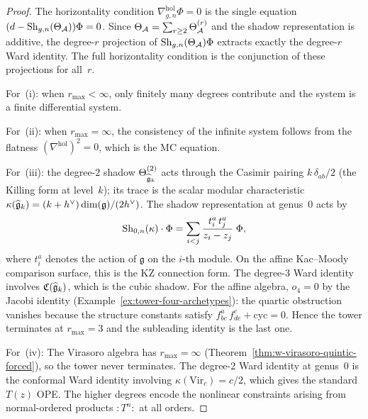 \begin{proof}
The horizontality condition $\nabla^{\mathrm{hol}}_{g,n}\Phi = 0$
is the single equation $(d - \operatorname{Sh}_{g,n}(\Theta_{\mathcal{A}}))\Phi = 0$.
Since $\Theta_{\mathcal{A}} = \sum_{r \geq 2} \Theta_{\mathcal{A}}^{(r)}$ and the
shadow representation is additive, the degree-$r$ projection of
$\operatorname{Sh}_{g,n}(\Theta_{\mathcal{A}})\Phi$ extracts exactly the degree-$r$ Ward
identity. The full horizontality condition is the conjunction of
these projections for all~$r$.

For~(i): when $r_{\max} < \infty$, only finitely many degrees
contribute and the system is a finite differential system.

For~(ii): when $r_{\max} = \infty$, the consistency of the
infinite system follows from the flatness
$(\nabla^{\mathrm{hol}})^2 = 0$, which is the MC equation.

For~(iii): the degree-$2$ shadow $\Theta^{(2)}_{\widehat{\mathfrak{g}}_k}$
acts through the Casimir pairing $k\,\delta_{ab}/2$ (the Killing form
at level~$k$); its trace is the scalar modular characteristic
$\kappa(\widehat{\mathfrak{g}}_k) = (k+h^\vee)\dim(\mathfrak{g})/(2h^\vee)$.
The shadow representation at genus~$0$ acts by
\begin{equation}\label{eq:thqg-VI-kz-recovery}
\operatorname{Sh}_{0,n}(\kappa) \cdot \Phi
= \sum_{i < j} \frac{t^a_i\,t^a_j}{z_i - z_j}\;\Phi,
\end{equation}
where $t^a_i$ denotes the action of $\mathfrak{g}$ on the
$i$-th module. On the affine Kac--Moody comparison surface, this
is the KZ connection form. The degree-$3$
Ward identity involves $\mathfrak{C}(\widehat{\mathfrak{g}}_k)$, which
is the cubic shadow. For the affine algebra, $o_4 = 0$ by the
Jacobi identity
(Example~\ref{ex:tower-four-archetypes}): the quartic obstruction
vanishes because the structure constants satisfy
$f^a_{bc}\,f^c_{de} + \text{cyc} = 0$. Hence the tower terminates
at $r_{\max} = 3$ and the subleading identity is the last one.

For~(iv): The Virasoro algebra has $r_{\max} = \infty$
(Theorem~\ref{thm:w-virasoro-quintic-forced}), so the tower
never terminates. The degree-$2$ Ward identity at genus~$0$
is the conformal Ward identity involving
$\kappa(\mathrm{Vir}_c) = c/2$,
which gives the standard $T(z)$ OPE. The higher degrees encode the
nonlinear constraints arising from normal-ordered products
$:T^n:$ at all orders.
\end{proof}

